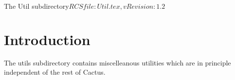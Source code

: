 %   

\begin{cactuspart}{8}{The Util subdirectory}{$RCSfile: Util.tex,v $}{$Revision: 1.2 $}
\renewcommand{\thepage}{\Alph{part}\arabic{page}}

\chapter{Introduction}

The utils subdirectory contains miscelleanous utilities which are in 
principle independent of the rest of Cactus.

\end{cactuspart}
